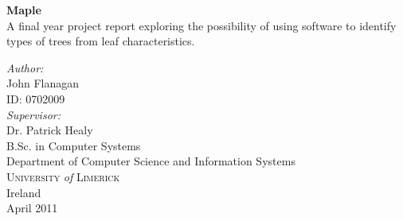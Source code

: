 \begin{titlepage}
 
\begin{center}
 
 
 
 
 
 
{ \huge \bfseries{Maple}}\\[1.0cm]
   A final year project report exploring the possibility of using software to identify types of trees from leaf characteristics.\\[1cm]
 

\vfill

\emph{Author:}\\
John Flanagan\\
ID: 0702009\\[1.0cm]
\emph{Supervisor:}\\
Dr. Patrick Healy\\[2.0cm]

 

 
B.Sc. in Computer Systems\\
Department of Computer Science and Information Systems\\
\textsc{University} \textit{of} \textsc{Limerick}\\
Ireland\\[1.0cm]
April 2011
 
\end{center}
 
\end{titlepage}
